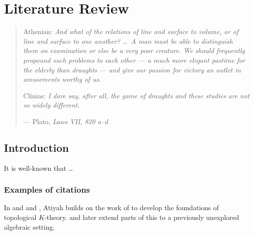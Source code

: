 %
%
%
%

\chapter{Literature Review}\label{C.litreview}

\begin{quote}
Athenian: \textit{And what of the relations of line and surface to volume, or of line and 
surface to one another? \ldots\ A man must be able to distinguish them on examination or 
else be a very poor creature.  We should frequently propound such problems to each other 
--- a much more elegant pastime for the elderly than draughts --- and give our passion 
for victory an outlet in amusements worthy of us.} 

Clinias: \textit{I dare say, after all, the game of draughts and these studies are not so 
widely different.}
\vspace{0.1cm}

--- Plato, \emph{Laws VII, 820 a--d}
\end{quote}

\section{Introduction}\label{S.intro2}

It is well-known that \ldots

\subsection{Examples of citations}\label{SS.citations}

In \citet{Ahmed:2000} and \citet{Al-Otaibi:2004} and \citet{Bettinelli:2010}, Atiyah builds on the work of \citet{Brunet:2012} to develop 
the foundations of topological $K$-theory.  \citet{Cavin:2005} and \citet{Schaus:2012} later extend parts of 
this to a previously unexplored algebraic setting.
